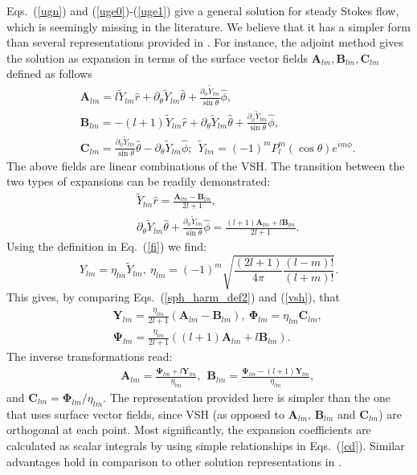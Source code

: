 \documentclass[aps,prx,twocolumn,amsmath,amssymb,amsfonts]{revtex4-2}
\begin{document}
{Eqs.~(\ref{ugn}) and (\ref{uge0})-(\ref{uge1}) give a general solution for steady Stokes flow, which is seemingly missing in the literature. We believe that it has a simpler form than several representations provided in \cite{kim}. For instance, the adjoint method \cite{kim} gives the solution as expansion in terms of the surface vector fields $\bm A_{lm}, \bm B_{lm}, \bm C_{lm}$ defined as follows
\begin{eqnarray}&&
\bm A_{lm} = l \tilde Y_{lm} \hat r + \partial_{\theta}\tilde Y_{lm} \hat \theta
+ \frac{\partial_{\phi}\tilde Y_{lm} }{\sin\theta}\hat \phi,
\label{sph_harm_def1}
\\&&
\bm B_{lm} =-(l+1) \tilde Y_{lm} \hat r + \partial_{\theta}\tilde Y_{lm} \hat \theta
+ \frac{\partial_{\phi}\tilde Y_{lm} }{\sin\theta}\hat \phi,
\nonumber\\&&
\bm C_{lm}\! =\! \frac{\partial_{\phi}\tilde Y_{lm}}{\sin\theta}\hat \theta
\!- \!\partial_{\theta}\tilde Y_{lm} \hat \phi;\ \  \tilde Y_{lm}\! =\! (-1)^m P_l^m(\cos\theta) e^{im\phi}.
\nonumber
\end{eqnarray}
The above fields are linear combinations of the VSH. The transition between the two types of expansions can be readily demonstrated:
\begin{eqnarray}&&
\tilde Y_{lm} \hat r = \frac{\bm A_{lm} - \bm B_{lm}}{2l+1},
\label{sph_harm_def2}\\&&
 \partial_{\theta}\tilde Y_{lm} \hat \theta
+ \frac{\partial_{\phi}\tilde Y_{lm} }{\sin\theta}\hat \phi =
\frac{(l+1)\bm A_{lm} + l\bm B_{lm}}{2l+1}.
\nonumber
\end{eqnarray}
Using the definition in Eq.~(\ref{fi}) we find:
$$
Y_{lm}= \eta_{lm}\tilde Y_{lm},
\ \eta_{lm}=(-1)^m\sqrt{\frac{(2l+1)}{4\pi}\frac{(l-m)!}{(l+m)!}}.
$$
This gives, by comparing Eqs.~(\ref{sph_harm_def2}) and (\ref{vsh}), that
\begin{eqnarray}&&
\bm Y_{lm} = \frac{\eta_{lm}}{2l+1} (\bm A_{lm} - \bm B_{lm}),\
\bm \Phi_{lm} = \eta_{lm} \bm C_{lm},
\nonumber \\&&
\bm \Psi_{lm} = \frac{\eta_{lm}}{2l+1} ((l+1)\bm A_{lm} + l\bm B_{lm}).
\label{YPsiPhi_via_ABC}
\end{eqnarray}
The inverse transformations read:
\begin{eqnarray}&&\!\!\!\!\!
\bm A_{lm} = \frac{\bm \Psi_{lm}+l \bm Y_{lm}}{\eta_{lm}}, \ \
\bm B_{lm} = \frac{\bm \Psi_{lm}-(l+1) \bm Y_{lm}}{\eta_{lm}},
\label{ABC_via_YPsiPhi}
\end{eqnarray}
and $ \bm C_{lm} =\bm \Phi_{lm}/\eta_{lm}$. The representation provided here is simpler than the one that uses surface vector fields, since
VSH (as opposed to $\bm A_{lm}$, $\bm B_{lm}$ and $\bm C_{lm}$) are orthogonal at each point. Most significantly, the expansion coefficients are calculated as scalar integrals by using simple relationships in  Eqs.~(\ref{cd}). Similar advantages hold in comparison to other solution representations in \cite{kim}.


}
\end{document}
